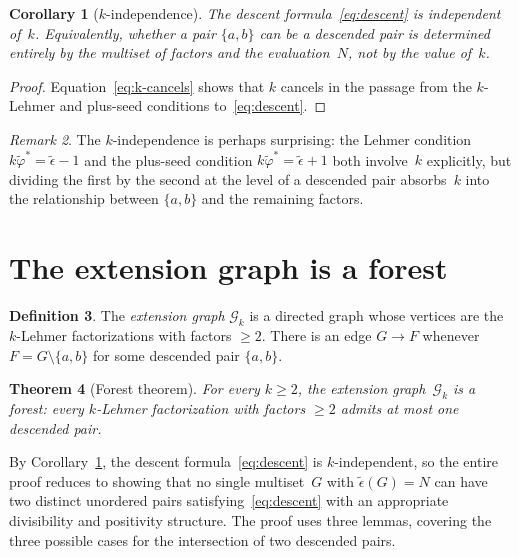 \documentclass[11pt]{article}
\newtheorem{theorem}{Theorem}
\newtheorem{corollary}[theorem]{Corollary}
\theoremstyle{definition}
\newtheorem{definition}[theorem]{Definition}
\theoremstyle{remark}
\newtheorem{remark}[theorem]{Remark}
\newcommand{\eps}{\tilde{\epsilon}}
\newcommand{\phist}{\tilde{\varphi}^*}
\begin{document}
\begin{corollary}[$k$-independence]\label{cor:k-free}
The descent formula~\eqref{eq:descent} is independent of~$k$.
Equivalently, whether a pair $\{a,b\}$ can be a descended pair is
determined entirely by the multiset of factors and the evaluation~$N$, not
by the value of~$k$.
\end{corollary}

\begin{proof}
Equation~\eqref{eq:k-cancels} shows that $k$ cancels in the passage from
the $k$-Lehmer and plus-seed conditions to~\eqref{eq:descent}.
\end{proof}

\begin{remark}
The $k$-independence is perhaps surprising: the Lehmer condition $k\phist =
\eps - 1$ and the plus-seed condition $k\phist = \eps + 1$ both involve~$k$
explicitly, but dividing the first by the second at the level of a
descended pair absorbs~$k$ into the relationship between $\{a,b\}$ and
the remaining factors.
\end{remark}


\section{The extension graph is a forest}

\begin{definition}
The \emph{extension graph} $\mathcal{G}_k$ is a directed graph whose
vertices are the $k$-Lehmer factorizations with factors $\ge 2$.  There is
an edge $G \to F$ whenever~$F = G \setminus \{a, b\}$ for some descended
pair $\{a, b\}$.
\end{definition}

\begin{theorem}[Forest theorem]\label{thm:forest}
For every $k \ge 2$, the extension graph~$\mathcal{G}_k$ is a forest:
every $k$-Lehmer factorization with factors $\ge 2$ admits at most one
descended pair.
\end{theorem}

By Corollary~\ref{cor:k-free}, the descent formula~\eqref{eq:descent} is
$k$-independent, so the entire proof reduces to showing that no single
multiset~$G$ with $\eps(G) = N$ can have two distinct unordered pairs
satisfying~\eqref{eq:descent} with an appropriate divisibility and
positivity structure.  The proof uses three lemmas, covering the three
possible cases for the intersection of two descended pairs.
\end{document}
